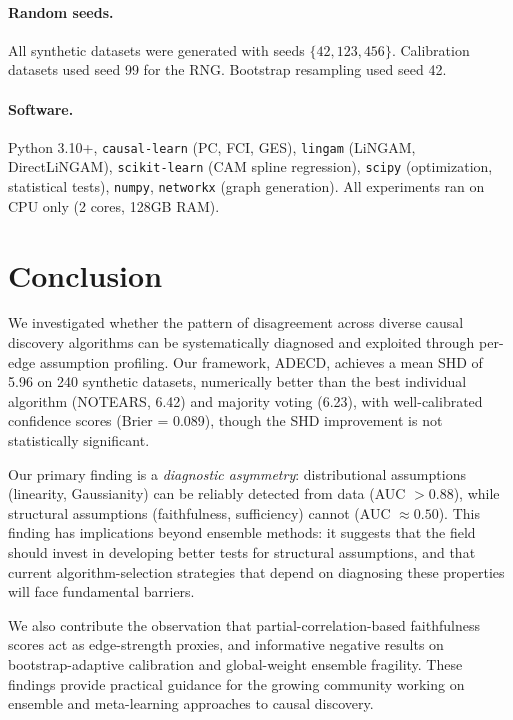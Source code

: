 \documentclass{article}
\newcommand{\adecd}{\textsc{ADECD}}
\begin{document}
\paragraph{Random seeds.}
All synthetic datasets were generated with seeds $\{42, 123, 456\}$.
Calibration datasets used seed 99 for the RNG.
Bootstrap resampling used seed 42.

\paragraph{Software.}
Python 3.10+, \texttt{causal-learn} (PC, FCI, GES), \texttt{lingam} (LiNGAM, DirectLiNGAM), \texttt{scikit-learn} (CAM spline regression), \texttt{scipy} (optimization, statistical tests), \texttt{numpy}, \texttt{networkx} (graph generation).
All experiments ran on CPU only (2 cores, 128GB RAM).

\section{Conclusion}
\label{sec:conclusion}

We investigated whether the pattern of disagreement across diverse causal discovery algorithms can be systematically diagnosed and exploited through per-edge assumption profiling.
Our framework, \adecd{}, achieves a mean SHD of 5.96 on 240 synthetic datasets, numerically better than the best individual algorithm (NOTEARS, 6.42) and majority voting (6.23), with well-calibrated confidence scores (Brier = 0.089), though the SHD improvement is not statistically significant.

Our primary finding is a \emph{diagnostic asymmetry}: distributional assumptions (linearity, Gaussianity) can be reliably detected from data (AUC $> 0.88$), while structural assumptions (faithfulness, sufficiency) cannot (AUC $\approx 0.50$).
This finding has implications beyond ensemble methods: it suggests that the field should invest in developing better tests for structural assumptions, and that current algorithm-selection strategies that depend on diagnosing these properties will face fundamental barriers.

We also contribute the observation that partial-correlation-based faithfulness scores act as edge-strength proxies, and informative negative results on bootstrap-adaptive calibration and global-weight ensemble fragility.
These findings provide practical guidance for the growing community working on ensemble and meta-learning approaches to causal discovery.



\end{document}
